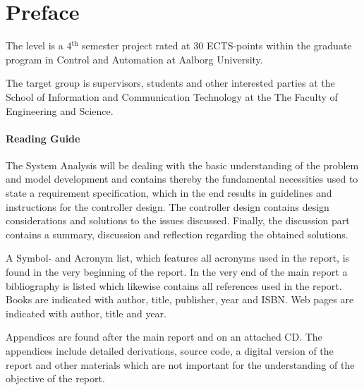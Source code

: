 \chapter*{Preface}
\vspace{-0.5cm}
The level is a 4$^\text{th}$ semester project rated at 30 ECTS-points within the graduate program in Control and Automation at Aalborg University.

The target group is supervisors, students and other interested parties at the School of Information and Communication Technology at the The Faculty of Engineering and Science.


\subsubsection{Reading Guide}
The System Analysis will be dealing with the basic understanding of the problem and model development and  contains thereby the fundamental necessities used to state a requirement specification, which in the end results in guidelines and instructions for the controller design. The controller design contains design considerations and solutions to the issues discussed. Finally, the discussion part contains a summary, discussion and reflection regarding the obtained solutions.

A Symbol- and Acronym list, which features all acronyms used in the report, is found in the very beginning of the report. In the very end of the main report a bibliography is listed which likewise contains all references used in the report. Books are indicated with author, title, publisher, year and ISBN. Web pages are indicated with author, title and year.

Appendices are found after the main report and on an attached CD. The appendices include detailed derivations, source code, a digital version of the report and other materials which are not important for the understanding of the objective of the report.

